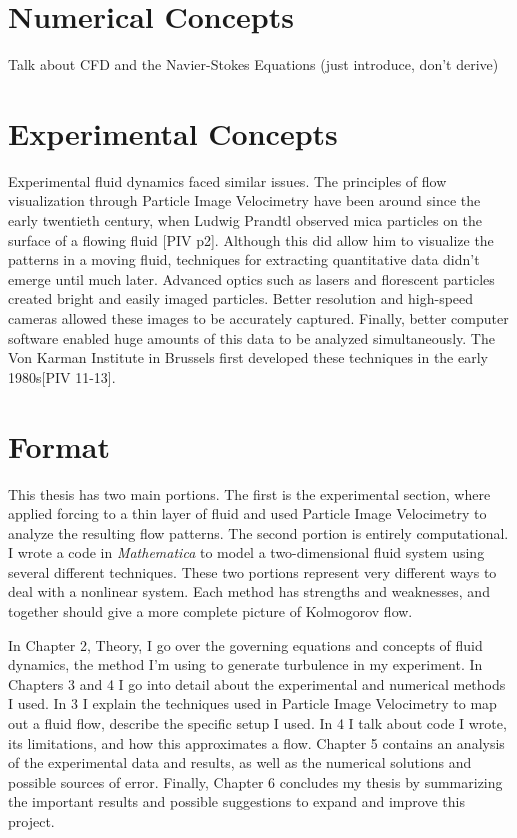 \section{Numerical Concepts}

Talk about CFD and the Navier-Stokes Equations (just introduce, don't derive)


\section{Experimental Concepts}
	
	Experimental fluid dynamics faced similar issues.  The principles of flow visualization through Particle Image Velocimetry have been around since the early twentieth century, when Ludwig Prandtl observed mica particles on the surface of a flowing fluid [PIV p2].  Although this did allow him to visualize the patterns in a moving fluid, techniques for extracting quantitative data didn’t emerge until much later.  Advanced optics such as lasers and florescent particles created bright and easily imaged particles.  Better resolution and high-speed cameras allowed these images to be accurately captured.  Finally, better computer software enabled huge amounts of this data to be analyzed simultaneously.  The Von Karman Institute in Brussels first developed these techniques in the early 1980s[PIV 11-13].

\section{Format}

	This thesis has two main portions.  The first is the experimental section, where applied forcing to a thin layer of fluid and used Particle Image Velocimetry to analyze the resulting flow patterns.  The second portion is entirely computational.  I wrote a code in \textit{Mathematica} to model a two-dimensional fluid system using several different techniques.  These two portions represent very different ways to deal with a nonlinear system.  Each method has strengths and weaknesses, and together should give a more complete picture of Kolmogorov flow.

	In Chapter 2, Theory, I go over the governing equations and concepts of fluid dynamics, the method I'm using to generate turbulence in my experiment.  In Chapters 3 and 4 I go into detail about the experimental and numerical methods I used.  In 3 I explain the techniques used in Particle Image Velocimetry to map out a fluid flow, describe the specific setup I used.  In 4 I talk about code I wrote, its limitations, and how this approximates a flow.  Chapter 5 contains an analysis of the experimental data and results, as well as the numerical solutions and possible sources of error.  Finally, Chapter 6 concludes my thesis by summarizing the important results and possible suggestions to expand and improve this project.

	
	
